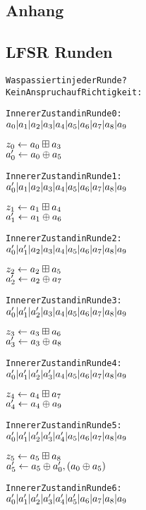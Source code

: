 \documentclass[a4paper,12pt]{article}
\begin{document}
\newpage
\begin{appendix}

\section{Anhang}
\subsection{LFSR Runden}

\begin{alltt}
Was passiert in jeder Runde?
Kein Anspruch auf Richtigkeit:

Innerer Zustand in Runde 0:
\( a\sb{0} | a\sb{1} | a\sb{2} | a\sb{3} | a\sb{4} | a\sb{5} | a\sb{6} | a\sb{7} | a\sb{8} | a\sb{9} \)

\( z\sb{0} \leftarrow a\sb{0} \boxplus a\sb{3}\)
\( a'\sb{0} \leftarrow a\sb{0} \oplus a\sb{5} \)

Innerer Zustand in Runde 1:
\( a'\sb{0} | a\sb{1} | a\sb{2} | a\sb{3} | a\sb{4} | a\sb{5} | a\sb{6} | a\sb{7} | a\sb{8} | a\sb{9} \)

\( z\sb{1} \leftarrow a\sb{1} \boxplus a\sb{4}\)
\( a'\sb{1} \leftarrow a\sb{1} \oplus a\sb{6} \)

Innerer Zustand in Runde 2:
\( a'\sb{0} | a'\sb{1} | a\sb{2} | a\sb{3} | a\sb{4} | a\sb{5} | a\sb{6} | a\sb{7} | a\sb{8} | a\sb{9} \)

\( z\sb{2} \leftarrow a\sb{2} \boxplus a\sb{5}\)
\( a'\sb{2} \leftarrow a\sb{2} \oplus a\sb{7} \)

Innerer Zustand in Runde 3:
\( a'\sb{0} | a'\sb{1} | a'\sb{2} | a\sb{3} | a\sb{4} | a\sb{5} | a\sb{6} | a\sb{7} | a\sb{8} | a\sb{9} \)

\( z\sb{3} \leftarrow a\sb{3} \boxplus a\sb{6}\)
\( a'\sb{3} \leftarrow a\sb{3} \oplus a\sb{8} \)

Innerer Zustand in Runde 4:
\( a'\sb{0} | a'\sb{1} | a'\sb{2} | a'\sb{3} | a\sb{4} | a\sb{5} | a\sb{6} | a\sb{7} | a\sb{8} | a\sb{9} \)

\( z\sb{4} \leftarrow a\sb{4} \boxplus a\sb{7}\)
\( a'\sb{4} \leftarrow a\sb{4} \oplus a\sb{9} \)

Innerer Zustand in Runde 5:
\( a'\sb{0} | a'\sb{1} | a'\sb{2} | a'\sb{3} | a'\sb{4} | a\sb{5} | a\sb{6} | a\sb{7} | a\sb{8} | a\sb{9} \)

\( z\sb{5} \leftarrow a\sb{5} \boxplus a\sb{8}\)
\( a'\sb{5} \leftarrow a\sb{5} \oplus a'\sb{0} , (a\sb{0} \oplus a\sb{5}) \) 

Innerer Zustand in Runde 6:
\( a'\sb{0} | a'\sb{1} | a'\sb{2} | a'\sb{3} | a'\sb{4} | a'\sb{5} | a\sb{6} | a\sb{7} | a\sb{8} | a\sb{9} \)


\end{alltt}
\end{appendix}
\end{document}
